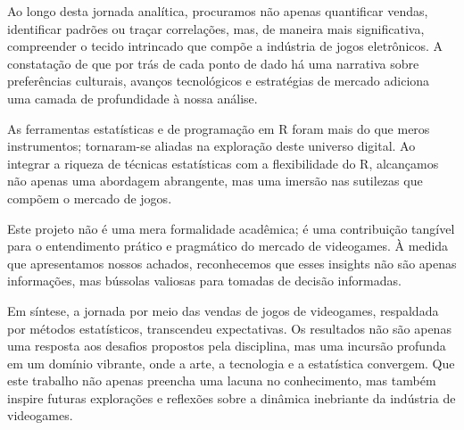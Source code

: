 \documentclass[draft]{agujournal2018}
\begin{document}
Ao longo desta jornada analítica, procuramos não apenas quantificar
vendas, identificar padrões ou traçar correlações, mas, de maneira mais
significativa, compreender o tecido intrincado que compõe a indústria de
jogos eletrônicos. A constatação de que por trás de cada ponto de dado
há uma narrativa sobre preferências culturais, avanços tecnológicos e
estratégias de mercado adiciona uma camada de profundidade à nossa
análise.

As ferramentas estatísticas e de programação em R foram mais do que
meros instrumentos; tornaram-se aliadas na exploração deste universo
digital. Ao integrar a riqueza de técnicas estatísticas com a
flexibilidade do R, alcançamos não apenas uma abordagem abrangente, mas
uma imersão nas sutilezas que compõem o mercado de jogos.

Este projeto não é uma mera formalidade acadêmica; é uma contribuição
tangível para o entendimento prático e pragmático do mercado de
videogames. À medida que apresentamos nossos achados, reconhecemos que
esses insights não são apenas informações, mas bússolas valiosas para
tomadas de decisão informadas.

Em síntese, a jornada por meio das vendas de jogos de videogames,
respaldada por métodos estatísticos, transcendeu expectativas. Os
resultados não são apenas uma resposta aos desafios propostos pela
disciplina, mas uma incursão profunda em um domínio vibrante, onde a
arte, a tecnologia e a estatística convergem. Que este trabalho não
apenas preencha uma lacuna no conhecimento, mas também inspire futuras
explorações e reflexões sobre a dinâmica inebriante da indústria de
videogames.


\end{document}
